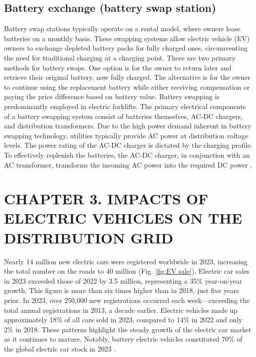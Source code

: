 \documentclass{thesis}
\begin{document}
\subsection{Battery exchange (battery swap station)}
Battery swap stations typically operate on a rental model, where owners lease batteries on a monthly basis.  These swapping systems allow electric vehicle (EV) owners to exchange depleted battery packs for fully charged ones, circumventing the need for traditional charging at a charging point. There are two primary methods for battery swaps. One option is for the owner to return later and retrieve their original battery, now fully charged. The alternative is for the owner to continue using the replacement battery while either receiving compensation or paying the price difference based on battery value. Battery swapping is predominantly employed in electric forklifts. The primary electrical components of a battery swapping system consist of batteries themselves, AC-DC chargers, and distribution transformers. Due to the high power demand inherent in battery swapping technology, utilities typically provide AC power at distribution voltage levels. The power rating of the AC-DC charger is dictated by the charging profile. To effectively replenish the batteries, the AC-DC charger, in conjunction with an AC transformer, transforms the incoming AC power into the required DC power \cite{charging_types}.

\newpage


\section*{CHAPTER 3. IMPACTS OF ELECTRIC VEHICLES ON THE DISTRIBUTION GRID}
\label{chuong3}
    
\setcounter{section}{3}
    \setcounter{subsection}{0}
        \setcounter{figure}{0}
            \setcounter{table}{0}

Nearly 14 million new electric cars were registered worldwide in 2023, increasing the total number on the roads to 40 million (Fig. \ref{fig:EV sale}). Electric car sales in 2023 exceeded those of 2022 by 3.5 million, representing a 35\% year-on-year growth. This figure is more than six times higher than in 2018, just five years prior. In 2023, over 250,000 new registrations occurred each week—exceeding the total annual registrations in 2013, a decade earlier. Electric vehicles made up approximately 18\% of all cars sold in 2023, compared to 14\% in 2022 and only 2\% in 2018. These patterns highlight the steady growth of the electric car market as it continues to mature. Notably, battery electric vehicles constituted 70\% of the global electric car stock in 2023 \cite{global_ev_outlook_2024}.
\end{document}
